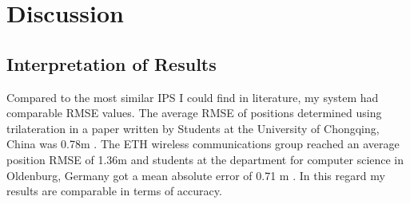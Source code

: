 \documentclass[a4paper, oneside]{ipsreport}
\begin{document}
\begin{table}[h]
	\centering
	\caption{Tabular overview of experimental results stemming from wrong MSE function}
	\label{table:2}
\end{table}


\chapter{Discussion}
\label{chapter:discussion}

\section{Interpretation of Results}
Compared to the most similar IPS I could find in literature, my system had comparable RMSE values. The average RMSE of positions determined using trilateration in a paper written by Students at the University of Chongqing, China was 0.78m \cite{ImuTrilaterationFusion}. The ETH wireless communications group reached an average position RMSE of 1.36m \cite{AntennaDiversity} and students at the department for computer science in Oldenburg, Germany got a mean absolute error of 0.71 m \cite{BLE}. In this regard my results are comparable in terms of accuracy.
\end{document}
